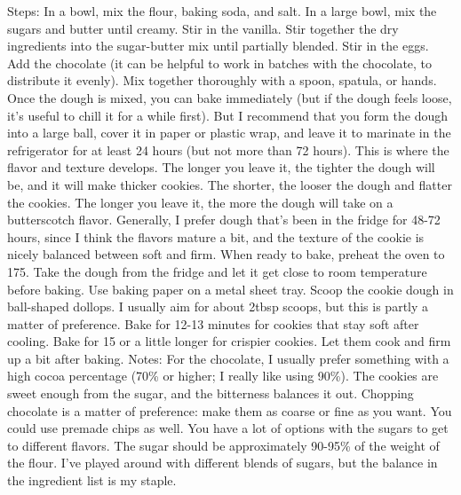 \documentclass[a4paper,10pt]{article}
\begin{document}
Steps:
In a bowl, mix the flour, baking
soda, and salt.
In a large bowl, mix the sugars
and butter until creamy. Stir in
the vanilla.
Stir together the dry ingredients
into the sugar-butter mix until
partially blended. Stir in the eggs.
Add the chocolate (it can be
helpful to work in batches with
the chocolate, to distribute it
evenly). Mix together thoroughly
with a spoon, spatula, or hands.
Once the dough is mixed, you can
bake immediately (but if the
dough feels loose, it's useful to
chill it for a while first). But I
recommend that you form the
dough into a large ball, cover it in
paper or plastic wrap, and leave it
to marinate in the refrigerator for
at least 24 hours (but not more
than 72 hours). This is where the
flavor and texture develops. The
longer you leave it, the tighter
the dough will be, and it will
make thicker cookies. The
shorter, the looser the dough and
flatter the cookies. The longer
you leave it, the more the dough
will take on a butterscotch flavor.
Generally, I prefer dough that's
been in the fridge for 48-72
hours, since I think the flavors
mature a bit, and the texture of
the cookie is nicely balanced
between soft and firm.
When ready to bake, preheat the
oven to 175. Take the dough from
the fridge and let it get close to
room temperature before baking.
Use baking paper on a metal
sheet tray. Scoop the cookie
dough in ball-shaped dollops. I
usually aim for about 2tbsp
scoops, but this is partly a matter
of preference.
Bake for 12-13 minutes for
cookies that stay soft after
cooling. Bake for 15 or a little
longer for crispier cookies.
Let them cook and firm up a bit
after baking.
Notes:
For the chocolate, I usually prefer
something with a high cocoa
percentage (70\% or higher; I
really like using 90\%). The cookies
are sweet enough from the sugar,
and the bitterness balances it out.
Chopping chocolate is a matter of
preference: make them as coarse
or fine as you want. You could
use premade chips as well.
You have a lot of options with the
sugars to get to different flavors.
The sugar should be
approximately 90-95\% of the
weight of the flour. I've played
around with different blends of
sugars, but the balance in the
ingredient list is my staple.
\newpage
\end{document}
